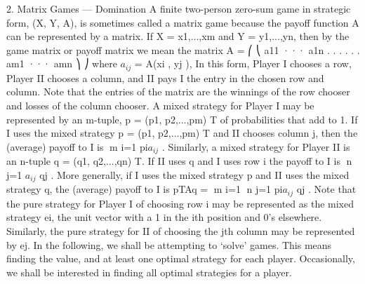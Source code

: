 \documentclass[]{report}
\begin{document}
2. Matrix Games — Domination
A finite two-person zero-sum game in strategic form, (X, Y, A), is sometimes called
a matrix game because the payoff function A can be represented by a matrix. If X =
{x1,...,xm} and Y = {y1,...,yn}, then by the game matrix or payoff matrix we mean
the matrix
A =
⎛
⎝
a11 ··· a1n
.
.
. .
.
.
am1 ··· amn
⎞
⎠ where $ a_{ij}$  = A(xi , yj ),
In this form, Player I chooses a row, Player II chooses a column, and II pays I the entry
in the chosen row and column. Note that the entries of the matrix are the winnings of the
row chooser and losses of the column chooser.
A mixed strategy for Player I may be represented by an m-tuple, p = (p1, p2,...,pm)
T
of probabilities that add to 1. If I uses the mixed strategy p = (p1, p2,...,pm)
T and II
chooses column j, then the (average) payoff to I is m
i=1 pi$ a_{ij}$  . Similarly, a mixed strategy
for Player II is an n-tuple q = (q1, q2,...,qn)
T. If II uses q and I uses row i the payoff
to I is n
j=1 $ a_{ij}$  qj . More generally, if I uses the mixed strategy p and II uses the mixed
strategy q, the (average) payoff to I is pTAq = m
i=1
n
j=1 pi$ a_{ij}$  qj .
Note that the pure strategy for Player I of choosing row i may be represented as the
mixed strategy ei, the unit vector with a 1 in the ith position and 0’s elsewhere. Similarly,
the pure strategy for II of choosing the jth column may be represented by ej. In the
following, we shall be attempting to ‘solve’ games. This means finding the value, and at
least one optimal strategy for each player. Occasionally, we shall be interested in finding
all optimal strategies for a player.

\end{document}
